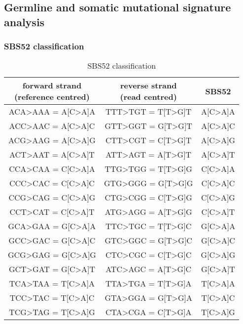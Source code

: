 \subsection{Germline and somatic mutational signature analysis}

\pagebreak 
\subsubsection{SBS52 classification}


\begingroup
\ttfamily
\begin{longtable}{c|c|c}
\caption{SBS52 classification} 
\label{tab:SBS52} \\ 
\makecell{forward strand \\ (reference centred)} & \makecell{reverse strand \\ (read centred)} & SBS52 \\ \hline
ACA>AAA = A[C>A]A & TTT>TGT = T[T>G]T & A[C>A]A \\ \hline
ACC>AAC	= A[C>A]C &	GTT>GGT	= G[T>G]T & A[C>A]C \\ \hline
ACG>AAG	= A[C>A]G & CTT>CGT	= C[T>G]T & A[C>A]G \\ \hline
ACT>AAT	= A[C>A]T & ATT>AGT	= A[T>G]T &	A[C>A]T \\ \hline
CCA>CAA	= C[C>A]A & TTG>TGG	= T[T>G]G &	C[C>A]A \\ \hline
CCC>CAC	= C[C>A]C & GTG>GGG	= G[T>G]G &	C[C>A]C \\ \hline
CCG>CAG	= C[C>A]G & CTG>CGG	= C[T>G]G &	C[C>A]G \\ \hline
CCT>CAT	= C[C>A]T & ATG>AGG	= A[T>G]G &	C[C>A]T \\ \hline
GCA>GAA	= G[C>A]A & TTC>TGC	= T[T>G]C &	G[C>A]A \\ \hline
GCC>GAC	= G[C>A]C & GTC>GGC	= G[T>G]C &	G[C>A]C \\ \hline
GCG>GAG	= G[C>A]G & CTC>CGC	= C[T>G]C &	G[C>A]G \\ \hline
GCT>GAT	= G[C>A]T & ATC>AGC	= A[T>G]C &	G[C>A]T \\ \hline
TCA>TAA	= T[C>A]A & TTA>TGA	= T[T>G]A &	T[C>A]A \\ \hline
TCC>TAC	= T[C>A]C & GTA>GGA	= G[T>G]A &	T[C>A]C \\ \hline
TCG>TAG	= T[C>A]G & CTA>CGA	= C[T>G]A &	T[C>A]G \\ \hline

\end{longtable}
